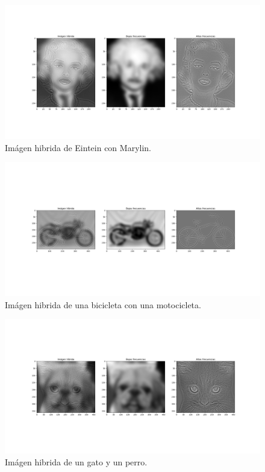 \documentclass[12pt, spanish]{article}
\begin{document}
\begin{figure}[H]
  \centering
      \includegraphics[width=\textwidth]{hibridas/E-M.png}
 		 \caption{Imágen hibrida de Eintein con Marylin.}
  		\label{fig:ej2al}

\end{figure}


\begin{figure}[H]
  \centering
      \includegraphics[width=\textwidth]{hibridas/B-M.png}
 		 \caption{Imágen hibrida de una bicicleta con una motocicleta.}
  		\label{fig:ej2al}

\end{figure}


\begin{figure}[H]
  \centering
      \includegraphics[width=\textwidth]{hibridas/G-P.png}
 		 \caption{Imágen hibrida de un gato y un perro.}
  		\label{fig:ej2al}

\end{figure}
\end{document}
